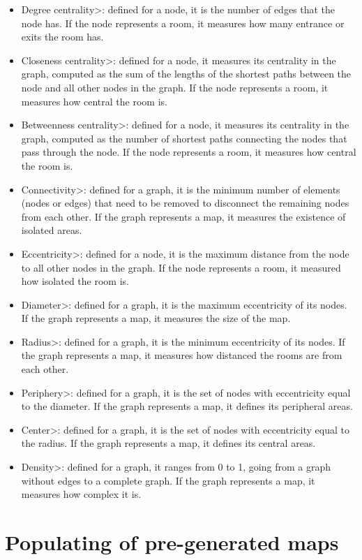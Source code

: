 \begin{itemize}
\item \<Degree centrality>: defined for a node, it is the number of edges that the node has. If the node represents a room, it measures how many entrance or exits the room has. 
\item \<Closeness centrality>: defined for a node, it measures its centrality in the graph, computed as the sum of the lengths of the shortest paths between the node and all other nodes in the graph. If the node represents a room, it measures how central the room is.
\item \<Betweenness centrality>: defined for a node, it measures its centrality in the graph, computed as the number of shortest paths connecting the nodes that pass through the node. If the node represents a room, it measures how central the room is.
\item \<Connectivity>: defined for a graph, it is the minimum number of elements (nodes or edges) that need to be removed to disconnect the remaining nodes from each other. If the graph represents a map, it measures the existence of isolated areas.
\item \<Eccentricity>: defined for a node, it is the maximum distance from the node to all other nodes in the graph. If the node represents a room, it measured how isolated the room is.
\item \<Diameter>: defined for a graph, it is the maximum eccentricity of its nodes. If the graph represents a map, it measures the size of the map.
\item \<Radius>: defined for a graph, it is the minimum eccentricity of its nodes. If the graph represents a map, it measures how distanced the rooms are from each other.
\item \<Periphery>: defined for a graph, it is the set of nodes with eccentricity equal to the diameter. If the graph represents a map, it defines its peripheral areas.
\item \<Center>: defined for a graph, it is the set of nodes with eccentricity equal to the radius. If the graph represents a map, it defines its central areas.
\item \<Density>: defined for a graph, it ranges from 0 to 1, going from a graph without edges to a complete graph. If the graph represents a map, it measures how complex it is.
\end{itemize}


\section{Populating of pre-generated maps}

